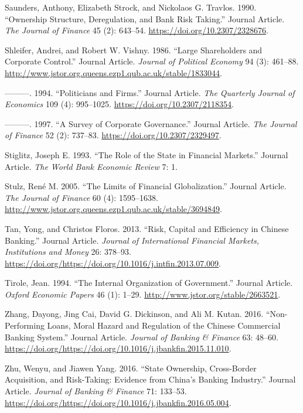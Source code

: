 \documentclass{article}
\begin{document}
\leavevmode\hypertarget{ref-RN70}{}%
Saunders, Anthony, Elizabeth Strock, and Nickolaos G. Travlos. 1990.
``Ownership Structure, Deregulation, and Bank Risk Taking.'' Journal
Article. \emph{The Journal of Finance} 45 (2): 643--54.
\url{https://doi.org/10.2307/2328676}.

\leavevmode\hypertarget{ref-RN71}{}%
Shleifer, Andrei, and Robert W. Vishny. 1986. ``Large Shareholders and
Corporate Control.'' Journal Article. \emph{Journal of Political
Economy} 94 (3): 461--88.
\url{http://www.jstor.org.queens.ezp1.qub.ac.uk/stable/1833044}.

\leavevmode\hypertarget{ref-RN72}{}%
---------. 1994. ``Politicians and Firms.'' Journal Article. \emph{The
Quarterly Journal of Economics} 109 (4): 995--1025.
\url{https://doi.org/10.2307/2118354}.

\leavevmode\hypertarget{ref-RN4}{}%
---------. 1997. ``A Survey of Corporate Governance.'' Journal Article.
\emph{The Journal of Finance} 52 (2): 737--83.
\url{https://doi.org/10.2307/2329497}.

\leavevmode\hypertarget{ref-RN73}{}%
Stiglitz, Joseph E. 1993. ``The Role of the State in Financial
Markets.'' Journal Article. \emph{The World Bank Economic Review} 7: 1.

\leavevmode\hypertarget{ref-RN74}{}%
Stulz, René M. 2005. ``The Limits of Financial Globalization.'' Journal
Article. \emph{The Journal of Finance} 60 (4): 1595--1638.
\url{http://www.jstor.org.queens.ezp1.qub.ac.uk/stable/3694849}.

\leavevmode\hypertarget{ref-RN75}{}%
Tan, Yong, and Christos Floros. 2013. ``Risk, Capital and Efficiency in
Chinese Banking.'' Journal Article. \emph{Journal of International
Financial Markets, Institutions and Money} 26: 378--93.
\url{https://doi.org/https://doi.org/10.1016/j.intfin.2013.07.009}.

\leavevmode\hypertarget{ref-RN76}{}%
Tirole, Jean. 1994. ``The Internal Organization of Government.'' Journal
Article. \emph{Oxford Economic Papers} 46 (1): 1--29.
\url{http://www.jstor.org/stable/2663521}.

\leavevmode\hypertarget{ref-RN77}{}%
Zhang, Dayong, Jing Cai, David G. Dickinson, and Ali M. Kutan. 2016.
``Non-Performing Loans, Moral Hazard and Regulation of the Chinese
Commercial Banking System.'' Journal Article. \emph{Journal of Banking
\& Finance} 63: 48--60.
\url{https://doi.org/https://doi.org/10.1016/j.jbankfin.2015.11.010}.

\leavevmode\hypertarget{ref-RN78}{}%
Zhu, Wenyu, and Jiawen Yang. 2016. ``State Ownership, Cross-Border
Acquisition, and Risk-Taking: Evidence from China's Banking Industry.''
Journal Article. \emph{Journal of Banking \& Finance} 71: 133--53.
\url{https://doi.org/https://doi.org/10.1016/j.jbankfin.2016.05.004}.



\end{document}

